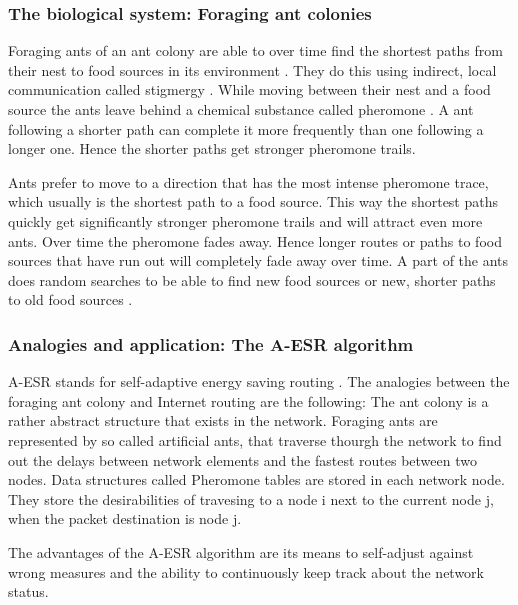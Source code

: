 \documentclass{IWORK2014}
\begin{document}
\subsubsection{The biological system: Foraging ant colonies}
Foraging ants of an ant colony are able to over time find the shortest paths from their nest to food sources in its environment \cite{dorigo1999ant, goss1989self}. They do this using indirect, local communication called stigmergy \cite{grasse1959reconstruction}. While moving between their nest and a food source the ants leave behind a chemical substance called pheromone \cite{ghosh2008aggregation}. A ant following a shorter path can complete it more frequently than one following a longer one. Hence the shorter paths get stronger pheromone trails.

Ants prefer to move to a direction that has the most intense pheromone trace, which usually is the shortest path to a food source. This way the shortest paths quickly get significantly stronger pheromone trails and will attract even more ants. Over time the pheromone fades away. Hence longer routes or paths to food sources that have run out will completely fade away over time. A part of the ants does random searches to be able to find new food sources or new, shorter paths to old food sources \cite{dressler2010bio}.

\subsubsection{Analogies and application: The A-ESR algorithm}
A-ESR stands for self-adaptive energy saving routing \cite{kim2012ant}. The analogies between the foraging ant colony and Internet routing are the following: The ant colony is a rather abstract structure that exists in the network. Foraging ants are represented by so called artificial ants, that traverse thourgh the network to find out the delays between network elements and the fastest routes between two nodes. Data structures called Pheromone tables are stored in each network node. They store the desirabilities of travesing to a node i next to the current node j, when the packet destination is node j.

The advantages of the A-ESR algorithm are its means to self-adjust against wrong measures and the ability to continuously keep track about the network status.

\end{document}
